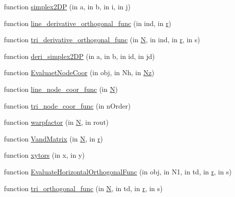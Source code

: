 \begin{DoxyCompactItemize}
\item 
function \hyperlink{class_std_prism_tri_a40a7e2ceeb9306b1916ba59fb857b14a}{simplex2\+DP} (in a, in b, in i, in j)
\item 
function \hyperlink{class_std_prism_tri_a4450a453e41593eb2b169ccc719788d8}{line\+\_\+derivative\+\_\+orthogonal\+\_\+func} (in ind, in \hyperlink{class_std_prism_tri_aad8e1b11ac7552139fe6aacc8728b249}{r})
\item 
function \hyperlink{class_std_prism_tri_a9115576d23e9cecc5fdb210a9b4fbcf7}{tri\+\_\+derivative\+\_\+orthogonal\+\_\+func} (in \hyperlink{class_std_prism_tri_ae66dea60d79b3eea15b9be2c1892d784}{N}, in ind, in \hyperlink{class_std_prism_tri_aad8e1b11ac7552139fe6aacc8728b249}{r}, in s)
\item 
function \hyperlink{class_std_prism_tri_ace65d47787f36f2171b91f280d44df11}{deri\+\_\+simplex2\+DP} (in a, in b, in id, in jd)
\item 
function \hyperlink{class_std_prism_tri_ab11ba4f464b2ed8d3c5815b085c04bdb}{Evaluaet\+Node\+Coor} (in obj, in Nh, in \hyperlink{class_std_prism_tri_a6d9a746cf2d10610a759d8a3dce6f8e7}{Nz})
\item 
function \hyperlink{class_std_prism_tri_a6126b62691432a677c060ad8e067dded}{line\+\_\+node\+\_\+coor\+\_\+func} (in \hyperlink{class_std_prism_tri_ae66dea60d79b3eea15b9be2c1892d784}{N})
\item 
function \hyperlink{class_std_prism_tri_a8aa0f7ddb7ed4dc838b627da8e86e7d2}{tri\+\_\+node\+\_\+coor\+\_\+func} (in n\+Order)
\item 
function \hyperlink{class_std_prism_tri_a34d51ef1bf6eb3380aef11d5161ccdda}{warpfactor} (in \hyperlink{class_std_prism_tri_ae66dea60d79b3eea15b9be2c1892d784}{N}, in rout)
\item 
function \hyperlink{class_std_prism_tri_a0704a6b1543f7bc2f1f1f1393cc30394}{Vand\+Matrix} (in \hyperlink{class_std_prism_tri_ae66dea60d79b3eea15b9be2c1892d784}{N}, in \hyperlink{class_std_prism_tri_aad8e1b11ac7552139fe6aacc8728b249}{r})
\item 
function \hyperlink{class_std_prism_tri_a032e476677854b16948a82236a2ba0a9}{xytors} (in x, in y)
\item 
function \hyperlink{class_std_prism_tri_aa1b9412cb2f569be10f8a7c2e2272dd5}{Evaluate\+Horizontal\+Orthogonal\+Func} (in obj, in N1, in td, in \hyperlink{class_std_prism_tri_aad8e1b11ac7552139fe6aacc8728b249}{r}, in s)
\item 
function \hyperlink{class_std_prism_tri_a94fd2a92e233dce1c2d3e3a95ab35a7e}{tri\+\_\+orthogonal\+\_\+func} (in \hyperlink{class_std_prism_tri_ae66dea60d79b3eea15b9be2c1892d784}{N}, in td, in \hyperlink{class_std_prism_tri_aad8e1b11ac7552139fe6aacc8728b249}{r}, in s)

\end{DoxyCompactItemize}
